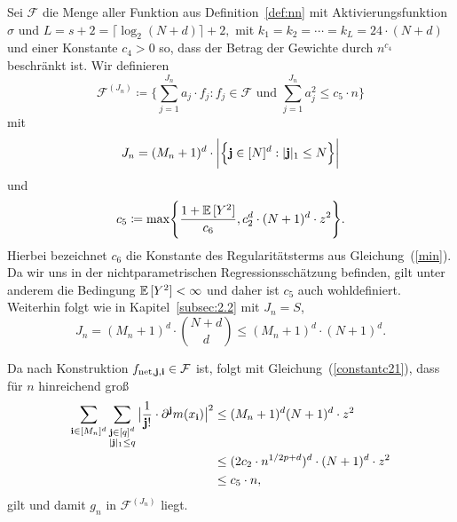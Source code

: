 {Sei $\mathcal{F}$ die Menge aller Funktion aus Definition~\ref{def:nn} mit Aktivierungsfunktion $\sigma$ und $L = s + 2 = \lceil\log_2(N + d)\rceil + 2,$ mit $k_1 = k_2 = \cdots = k_L = 24 \cdot (N + d)$ und einer Konstante $c_4 > 0$ so, dass der Betrag der Gewichte durch $n^{c_{4}}$ beschränkt ist. Wir definieren
$$ \mathcal{F}^{(J_n)} \coloneqq \biggl\{\sum_{j = 1}^{J_n} a_j \cdot f_j : f_j \in \mathcal{F} \text{ und } \sum_{j = 1}^{J_n} a_j^2 \leq c_5 \cdot n \biggr\}$$
mit 
$$
J_n = (M_n + 1)^d \cdot \bigg|\Bigl\{\mathbf{j} \in [N]^d : |\mathbf{j}|_1 \leq N \Bigr\}\bigg|$$
und
\begin{equation}
\label{constantc21}
\begin{split}
c_5 \coloneqq \max\Biggl\{\frac{1 + \mathbb{E}\,[Y^2]}{c_6}, c_2^d \cdot (N + 1)^d \cdot z^2\Biggr\}.
\end{split}
\end{equation}
Hierbei bezeichnet $c_6$ die Konstante des Regularitätsterms aus Gleichung~(\ref{min}). Da wir uns in der nichtparametrischen Regressionsschätzung befinden, gilt unter anderem die Bedingung $\mathbb{E}\,[Y^2] < \infty$ und daher ist $c_5$ auch wohldefiniert. 
Weiterhin folgt wie in Kapitel~\ref{subsec:2.2} mit $J_n = S$,
$$J_n =  (M_n + 1)^d \cdot \binom{N + d}{d} \leq (M_n + 1)^d \cdot (N + 1)^d.$$

Da nach Konstruktion $f_{\mathrm{net},\mathbf{j},\mathbf{i}} \in \mathcal{F}$ ist, folgt mit Gleichung~(\ref{constantc21}), dass für $n$ hinreichend groß
\begin{equation*}
\begin{split}
\sum_{\mathbf{i} \in [M_n]^d} \sum_{\substack{ \mathbf{j} \in [q]^d \\ |\mathbf{j}|_1 \leq q}} \big| \frac{1}{\mathbf{j}!} \cdot \partial^{\mathbf{j}}m(x_{\mathbf{i}})\big|^2 & \leq (M_n + 1)^d (N + 1)^d \cdot z^2 \\
& \leq (2 c_2 \cdot n^{1/2p + d})^d \cdot (N + 1)^d \cdot z^2 \\
& \leq c_5 \cdot n,
\end{split}
\end{equation*}
gilt und damit $g_n$ in $\mathcal{F}^{(J_n)}$ liegt. 

}
